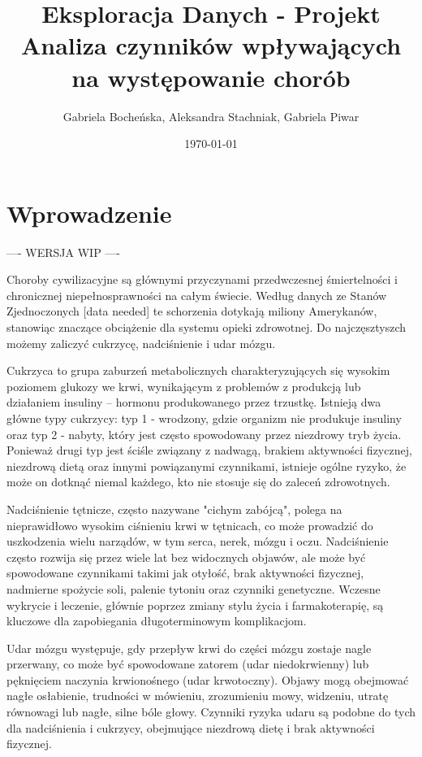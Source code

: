 \documentclass[onecolumn,12pt]{article}
\begin{document}
\title{Eksploracja Danych - Projekt\\
Analiza czynników wpływających na występowanie chorób}
\author{Gabriela Bocheńska, Aleksandra Stachniak, Gabriela Piwar}
\date{\today}
\maketitle

\tableofcontents
\thispagestyle{empty}

\section{Wprowadzenie}

---- WERSJA WIP ---- 

Choroby cywilizacyjne są głównymi przyczynami przedwczesnej śmiertelności i chronicznej niepełnosprawności na całym świecie. Według danych ze Stanów Zjednoczonych [data needed] te schorzenia dotykają miliony Amerykanów, stanowiąc znaczące obciążenie dla systemu opieki zdrowotnej. Do najczęsztyszch możemy zaliczyć cukrzycę, nadciśnienie i udar mózgu.

Cukrzyca to grupa zaburzeń metabolicznych charakteryzujących się wysokim poziomem glukozy we krwi, wynikającym z problemów z produkcją lub działaniem insuliny – hormonu produkowanego przez trzustkę. Istnieją dwa główne typy cukrzycy: typ 1 - wrodzony, gdzie organizm nie produkuje insuliny oraz typ 2 - nabyty, który jest często spowodowany przez niezdrowy tryb życia. Ponieważ
drugi typ jest ściśle związany z nadwagą, brakiem aktywności fizycznej, niezdrową dietą oraz innymi powiązanymi czynnikami, istnieje ogólne ryzyko, że może on dotknąć niemal każdego, kto nie stosuje się do zaleceń zdrowotnych.

Nadciśnienie tętnicze, często nazywane "cichym zabójcą", polega na nieprawidłowo wysokim ciśnieniu krwi w tętnicach, co może prowadzić do uszkodzenia wielu narządów, w tym serca, nerek, mózgu i oczu. Nadciśnienie często rozwija się przez wiele lat bez widocznych objawów, ale może być spowodowane czynnikami takimi jak otyłość, brak aktywności fizycznej, nadmierne spożycie soli, palenie tytoniu oraz czynniki genetyczne. Wczesne wykrycie i leczenie, głównie poprzez zmiany stylu życia i farmakoterapię, są kluczowe dla zapobiegania długoterminowym komplikacjom.

Udar mózgu występuje, gdy przepływ krwi do części mózgu zostaje nagle przerwany, co może być spowodowane zatorem (udar niedokrwienny) lub pęknięciem naczynia krwionośnego (udar krwotoczny). Objawy mogą obejmować nagłe osłabienie, trudności w mówieniu, zrozumieniu mowy, widzeniu, utratę równowagi lub nagłe, silne bóle głowy. Czynniki ryzyka udaru są podobne do tych dla nadciśnienia i cukrzycy, obejmujące niezdrową dietę i brak aktywności fizycznej.
\end{document}
